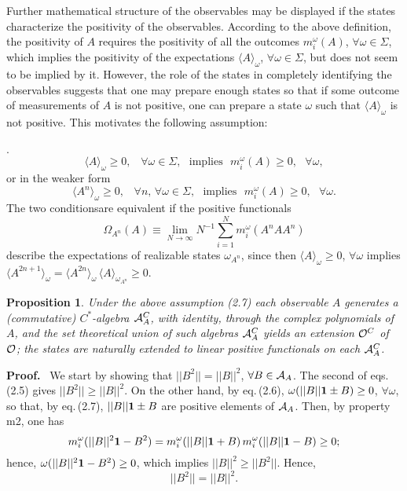 \documentclass[12pt]{article}
\newtheorem{Proposition}[Theorem]{Proposition}
\def \lan   {\langle}
\def \ran   {\rangle}
\def \Pf {{\bf Proof.\,\,}}
\def \be {\begin{equation}}
\def \ee {\end{equation}}
\def \ra {\rightarrow}
\def \eqq {\equiv}
\def \om {{\omega}}
\def \A {{\cal A}}
\def \O {{\cal O}}
\def \id {{\bf 1 }}
\begin{document}
\def \AC {\A_A^C}
\vspace{1mm} Further mathematical structure of the observables may be displayed if the states characterize the positivity of the observables.
According to the above definition, the positivity of $A$ requires the positivity of all the outcomes $m^\om_i(A)$, $\forall \om \in \Sigma$, which implies the positivity of  the expectations $\lan A \ran_\om$, $\forall \om \in \Sigma$, 
but does not seem to be implied by it. However, the role of the states in completely identifying the observables suggests that 
 one may prepare enough states so that if some outcome of measurements of $A$ is not positive, one can prepare a state $\omega$ such that $\lan A \ran_\om$ is not positive. This motivates the following assumption:

\vspace{1mm}. \be{ \lan A \ran_\om \geq 0, \,\,\,\,\, \forall \om  \in \Sigma, \,\,\,\,\mbox{implies}\,\,\,\, m^\om_i(A) \geq 0, \,\,\,\,\forall \om,}\end{equation} 
or in the weaker form $$\lan A^n \ran_\om \geq 0, \,\,\,\,\,\forall n, \, \forall \om  \in \Sigma, \,\,\,\,\mbox{implies}\,\,\,\, m^\om_i(A) \geq 0, \,\,\,\,\forall \om. $$
The two conditionsare equivalent if the positive functionals 
$$ \Omega_{A^n}(A) \eqq \lim_{N \ra \infty} N^{-1} \sum_{i = 1}^N m_i^\omega(A^n A A^n)$$ describe the expectations of realizable states $\omega_{A^n}$, since then $\lan A \ran_\omega \geq 0$, $\forall \omega$ implies $\lan A^{2n + 1}\ran_\omega = \lan A^{2n} \ran_\omega \, \lan A \ran_{\omega_{A^n}} \geq 0$. 

\begin{Proposition} Under the above assumption (2.7)
each observable $A$ generates a (commutative)  $C^*$-al\-ge\-bra $\A_A^C$, with identity,  through the  complex polynomials of $A$,  and the set theoretical union of such algebras $\A_A^C$ yields an extension $\O^C$ of $\O$; the states are naturally extended  to linear positive functionals on each $\A_A^C$.
\end{Proposition}
\Pf\, We start by showing that  
$|| B^2 || = || B ||^2$, $\forall B \in \A_A$. The second of eqs.(2.5) gives
 $|| B^2 || \geq || B ||^2$. 
On the other hand, by eq.\,(2.6),  $\om(|| B || \id \pm B) \geq 0$, $\forall \om$, so that, by eq.\,(2.7),    $|| B || \id \pm B $ are positive elements of $\A_A$. 
Then,  by property m2, one has  $$m^\om_i(|| B ||^2 \id - B^2)  = m^\om_i(|| B || \id + B)\,m^\om_i(|| B || \id - B) \geq 0;$$ hence,  $\om(|| B ||^2 \id - B^2) \geq 0 $, which implies  $ || B ||^2 \geq || B^2 || $. Hence,  
\be{|| B^2 || = || B ||^2.}\ee
\end{document}
